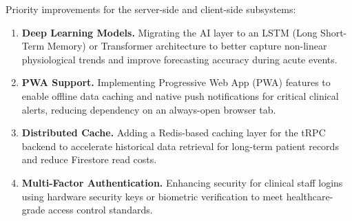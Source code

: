 Priority improvements for the server-side and client-side subsystems:

\begin{enumerate}
	\item \textbf{Deep Learning Models.} Migrating the AI layer to an LSTM (Long Short-Term Memory) or Transformer architecture to better capture non-linear physiological trends and improve forecasting accuracy during acute events.

	\item \textbf{PWA Support.} Implementing Progressive Web App (PWA) features to enable offline data caching and native push notifications for critical clinical alerts, reducing dependency on an always-open browser tab.

	\item \textbf{Distributed Cache.} Adding a Redis-based caching layer for the tRPC backend to accelerate historical data retrieval for long-term patient records and reduce Firestore read costs.

	\item \textbf{Multi-Factor Authentication.} Enhancing security for clinical staff logins using hardware security keys or biometric verification to meet healthcare-grade access control standards.
\end{enumerate}
